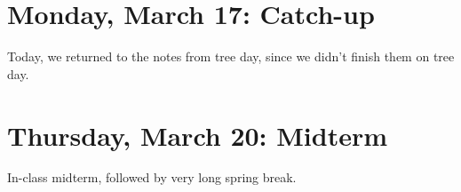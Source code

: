 \section{Monday, March 17: Catch-up}

Today, we returned to the notes from tree day, since we didn't finish them on tree day. 

\section{Thursday, March 20: Midterm}

In-class midterm, followed by very long spring break. 






